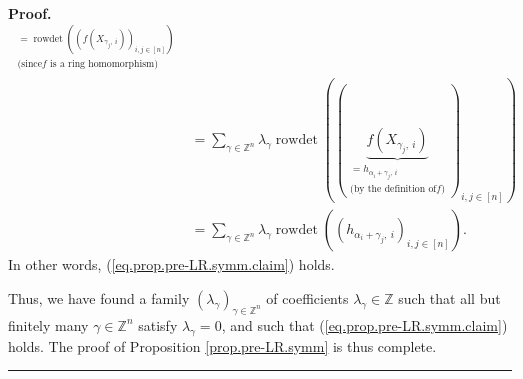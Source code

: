 \documentclass
[numbers=enddot,12pt,final,onecolumn,notitlepage,english]{scrartcl}%
\theoremstyle{definition}
\newenvironment{proof}[1][Proof]{\noindent\textbf{#1.} }{\ \rule{0.5em}{0.5em}}
\let\sumnonlimits\sum
\renewcommand{\sum}{\sumnonlimits\limits}
\begin{document}
\begin{proof}
\begin{align*}
{}_{\substack{=\operatorname*{rowdet}\left(  \left(  f\left(  X_{\gamma
_{j},\ i}\right)  \right)  _{i,j\in\left[  n\right]  }\right)  \\\text{(since
}f\text{ is a ring homomorphism)}}}\\
&  =\sum_{\gamma\in\mathbb{Z}^{n}}\lambda_{\gamma}\operatorname*{rowdet}%
\left(  \left(  \underbrace{f\left(  X_{\gamma_{j},\ i}\right)  }%
_{\substack{=h_{\alpha_{i}+\gamma_{j},\ i}\\\text{(by the definition of
}f\text{)}}}\right)  _{i,j\in\left[  n\right]  }\right) \\
&  =\sum_{\gamma\in\mathbb{Z}^{n}}\lambda_{\gamma}\operatorname*{rowdet}%
\left(  \left(  h_{\alpha_{i}+\gamma_{j},\ i}\right)  _{i,j\in\left[
n\right]  }\right)  .
\end{align*}
In other words, (\ref{eq.prop.pre-LR.symm.claim}) holds.

Thus, we have found a family $\left(  \lambda_{\gamma}\right)  _{\gamma
\in\mathbb{Z}^{n}}$ of coefficients $\lambda_{\gamma}\in\mathbb{Z}$ such that
all but finitely many $\gamma\in\mathbb{Z}^{n}$ satisfy $\lambda_{\gamma}=0$,
and such that (\ref{eq.prop.pre-LR.symm.claim}) holds. The proof of
Proposition \ref{prop.pre-LR.symm} is thus complete.
\end{proof}
\end{document}

